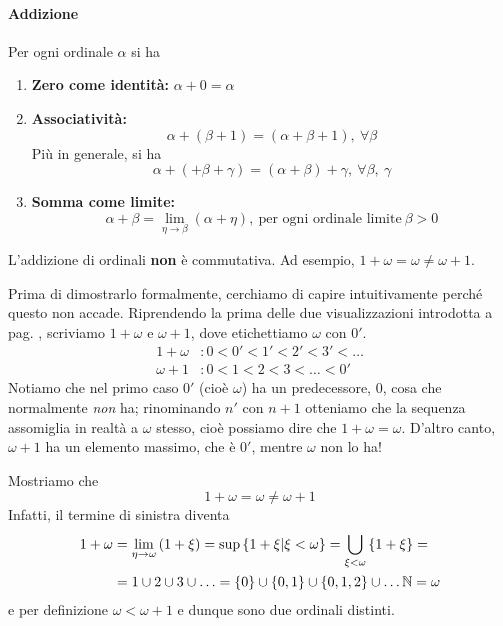 \paragraph{Addizione}
\begin{define}
	Per ogni ordinale $\alpha$ si ha
	\begin{enumerate}
		\item \textbf{Zero come identità:}
		$\alpha+0=\alpha$
		\item \textbf{Associatività:}
		\begin{equation*}
			\alpha+\left(\beta+1\right)=\left(\alpha+\beta+1\right),\ \forall \beta
		\end{equation*}
		Più in generale, si ha
		\begin{equation*}
			\alpha+\left(+\beta+\gamma\right)=\left(\alpha+\beta\right)+\gamma,\ \forall \beta,\ \gamma
		\end{equation*}
		\item \textbf{Somma come limite:}
		\begin{equation*}
			\alpha+\beta=\lim_{\eta\to\beta}\left(\alpha+\eta\right),\ \text{per ogni ordinale limite}\ \beta>0
		\end{equation*}
	\end{enumerate}
\end{define}
\begin{attention}
	L'addizione di ordinali \textbf{non} è commutativa. Ad esempio, $1+\omega=\omega\neq\omega+1$.
\end{attention}
\begin{intuit}
	Prima di dimostrarlo formalmente, cerchiamo di capire intuitivamente perché questo non accade. Riprendendo la prima delle due visualizzazioni introdotta a pag. \pageref{visualizzazioneordinali}, scriviamo $1+\omega$ e $\omega+1$, dove etichettiamo $\omega$ con $0'$.
	\begin{align*}
		1+\omega&\colon0<0'<1'<2'<3'<\ldots\\
		\omega+1&\colon0<1<2<3<\ldots<0'
	\end{align*}
	Notiamo che nel primo caso $0'$ (cioè $\omega$) ha un predecessore, $0$, cosa che normalmente \textit{non} ha; rinominando $n'$ con $n+1$ otteniamo che la sequenza assomiglia in realtà a $\omega$ stesso, cioè possiamo dire che $1+\omega=\omega$. D'altro canto, $\omega+1$ ha un elemento massimo, che è $0'$, mentre $\omega$ non lo ha!
\end{intuit}
\begin{examplewt}
	Mostriamo che
	\begin{equation*}
		1+\omega=\omega\neq\omega+1
	\end{equation*}
 	Infatti, il termine di sinistra diventa
 	\begin{align*}
 		1+\omega&=\lim_{\eta\to \omega}\left(1+\xi\right)=\sup\left\{1+\xi\middle|\xi<\omega\right\}=\bigcup_{\xi<\omega}\left\{1+\xi\right\}=\\
 		&=1\cup 2\cup 3\cup \ldots=\{0\}\cup\{0,1\}\cup\{0,1,2\}\cup\ldots\mathbb{N}=\omega
 	\end{align*}
 	e per definizione $\omega<\omega+1$ e dunque sono due ordinali distinti.
\end{examplewt}
